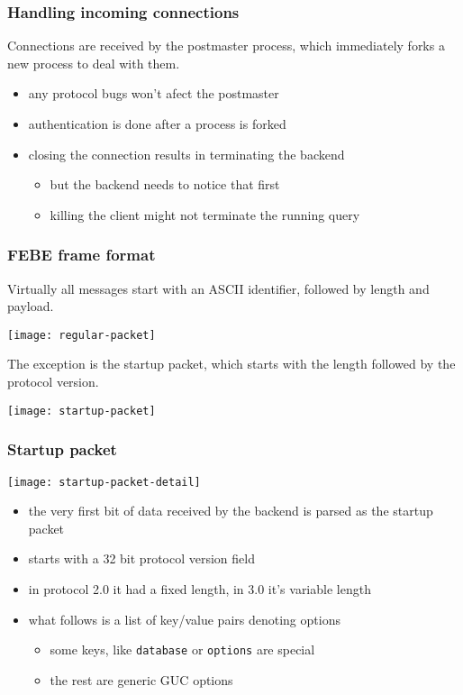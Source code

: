 \documentclass{beamer}
\begin{document}
\begin{frame}
  \frametitle{Handling incoming connections}

  Connections are received by the postmaster process, which immediately forks a
  new process to deal with them.

  \begin{itemize}
  \item any protocol bugs won't afect the postmaster
  \item authentication is done after a process is forked
  \item closing the connection results in terminating the backend
    \begin{itemize}
    \item but the backend needs to notice that first
    \item killing the client might not terminate the running query
    \end{itemize}
  \end{itemize}
\end{frame}

\begin{frame}
  \frametitle{FEBE frame format}

  Virtually all messages start with an ASCII identifier, followed by length and
  payload.

  \begin{center}
    \texttt{[image: regular-packet]}
  \end{center}

  The exception is the startup packet, which starts with the length followed by
  the protocol version.

  \begin{center}
    \texttt{[image: startup-packet]}
  \end{center}

\end{frame}

\begin{frame}
  \frametitle{Startup packet}

  \begin{center}
    \texttt{[image: startup-packet-detail]}
  \end{center}

  \begin{itemize}
  \item the very first bit of data received by the backend is parsed as the
    startup packet
  \item starts with a 32 bit protocol version field
  \item in protocol 2.0 it had a fixed length, in 3.0 it's variable length
  \item what follows is a list of key/value pairs denoting options
    \begin{itemize}
    \item some keys, like \texttt{database} or \texttt{options} are special
    \item the rest are generic GUC options
    \end{itemize}
  \end{itemize}
\end{frame}
\end{document}
